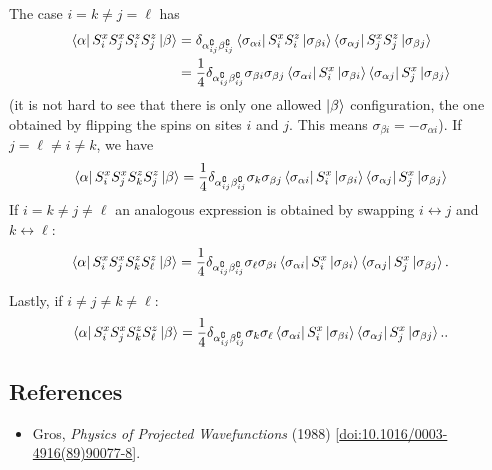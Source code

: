 \documentclass{report}
\begin{document}
The case $ i=k \neq j = \ell$ has 
\begin{align*}
	\bra{\alpha} S_i^x S_j^x S_i^z S_j^z \ket{\beta}
		&= \delta_{\alpha^\complement_{ij}\beta_{ij}^\complement}
			\bra{\sigma_{\alpha i}} S_i^x S_i^z\ket{\sigma_{\beta i}}
			\bra{\sigma_{\alpha j}} S_j^x S_j^z\ket{\sigma_{\beta j}}\\
		&= \frac{1}{4} 
			\delta_{\alpha^\complement_{ij}\beta_{ij}^\complement}
			\sigma_{\beta i}\sigma_{\beta j}\bra{\sigma_{\alpha i}} S_i^x \ket{\sigma_{\beta i}}
			\bra{\sigma_{\alpha j}} S_j^x \ket{\sigma_{\beta j}}
\end{align*}
(it is not hard to see that there is only one allowed $ \ket{\beta} $ configuration, 
the one obtained by flipping the spins on sites $ i $ and $ j $. This means 
$ \sigma_{\beta i}= - \sigma_{\alpha i} $). 
If $ j=\ell \neq i \neq k $, we have 
\begin{equation*}
	\bra{\alpha} S_i^x S_j^x S_k^z S_j^z \ket{\beta}
		=\frac{1}{4} \delta_{\alpha_{ij}^\complement \beta_{ij}^\complement}
			\sigma_k \sigma_{\beta j}
			\bra{\sigma_{\alpha i}} S_i^x \ket{\sigma_{\beta i}}
			\bra{\sigma_{\alpha j}} S_j^x \ket{\sigma_{\beta j}}
\end{equation*}
If $ i=k\neq j\neq \ell $ an analogous expression is obtained by swapping $ i\leftrightarrow j $
and $ k\leftrightarrow \ell $: 
\begin{equation*}
	\bra{\alpha} S_i^x S_j^x S_k^z S_\ell^z \ket{\beta}
		= \frac{1}{4}
			\delta_{\alpha_{ij}^\complement \beta_{ij}^\complement}
			\sigma_{\ell} \sigma_{\beta i} 
			\bra{\sigma_{\alpha i}} S_i^x \ket{\sigma_{\beta i}}
			\bra{\sigma_{\alpha j}} S_j^x \ket{\sigma_{\beta j}}.
\end{equation*}

Lastly, if $ i\neq j\neq k\neq \ell $: 
\begin{equation*}
	\bra{\alpha} S_i^x S_j^x S_k^z S_\ell^z \ket{\beta}
		= \frac{1}{4}
			\delta_{\alpha_{ij}^\complement \beta_{ij}^\complement} 
			\sigma_{k}\sigma_{\ell} 
			\bra{\sigma_{\alpha i}} S_i^x \ket{\sigma_{\beta i}}
			\bra{\sigma_{\alpha j}} S_j^x \ket{\sigma_{\beta j}}..
\end{equation*}

\subsection*{References} 
\begin{itemize}[nosep]
\item Gros, \textit{Physics of Projected Wavefunctions} (1988) [\href{https://ui.adsabs.harvard.edu/link_gateway/1989AnPhy.189...53G/doi:10.1016/0003-4916(89)90077-8}{doi:10.1016/0003-4916(89)90077-8}]. 
\end{itemize}
\end{document}
